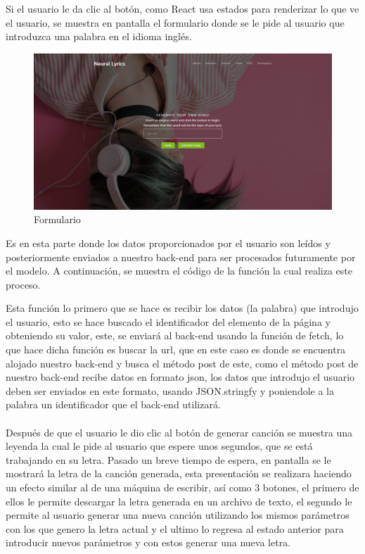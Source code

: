 \documentclass[12pt, a4paper, titlepage]{report}
\begin{document}
Si el usuario le da clic al botón, como React usa estados para renderizar lo que ve el usuario, se muestra en pantalla el formulario donde se le pide al usuario que introduzca una palabra en el idioma inglés.
\begin{figure}[H]
	\includegraphics[width=13.5cm]{./imagenes/Desarrollo/AplicacionWeb/Pformulario.png}
	\centering 
	\caption{Formulario}
\end{figure}
Es en esta parte donde los datos proporcionados por el usuario son leídos y posteriormente enviados a nuestro back-end para ser procesados futuramente por el modelo. A continuación, se muestra el código de la función la cual realiza este proceso.
\begin{center}
	
\end{center}
Esta función lo primero que se hace es recibir los datos (la palabra) que introdujo el usuario, esto se hace buscado el identificador del elemento de la página y obteniendo su valor, este, se enviará al back-end usando la función de fetch, lo que hace dicha función es buscar la url, que en este caso es donde se encuentra alojado nuestro back-end y busca el método post de este, como el método post de nuestro back-end recibe datos en formato json, los datos que introdujo el usuario deben ser enviados en este formato, usando JSON.stringfy y poniendole a la palabra un identificador que el back-end utilizará.\\\\
Después de que el usuario le dio clic al botón de generar canción se muestra una leyenda la cual le pide al usuario que espere unos segundos, que se está trabajando en su letra. Pasado un breve tiempo de espera, en pantalla se le mostrará la letra de la canción generada, esta presentación se realizara haciendo un efecto similar al de una máquina de escribir, así como 3 botones, el primero de ellos le permite descargar la letra generada en un archivo de texto, el segundo le permite al usuario generar una nueva canción utilizando los mismos parámetros con los que genero la letra actual y el ultimo lo regresa al estado anterior para introducir nuevos parámetros y con estos generar una nueva letra.
\end{document}
